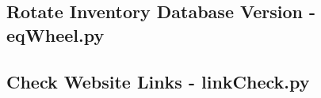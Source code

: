 \documentclass[justified]{pjlProcessDocs}
\begin{document}
\subsection{Rotate Inventory Database Version - eqWheel.py}



\subsection{Check Website Links - linkCheck.py}


\end{document}
